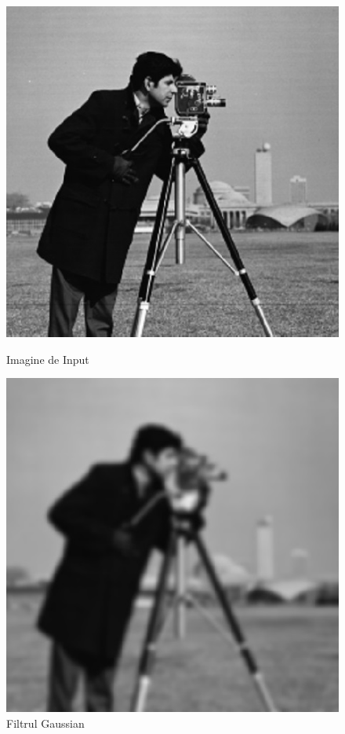 \documentclass[a4paper,12pt]{report}
\begin{document}
\begin{figure}[h!]
    \centering
    \begin{minipage}{0.35\textwidth}
        \centering
        \includegraphics[width=1\textwidth]{images/input_low_pass.jpg}
        \caption{Imagine de Input}
    \end{minipage}
    \hspace{0.01\textwidth}
    \begin{minipage}{0.35\textwidth}
        \centering
        \includegraphics[width=1\textwidth]{images/output_low_pass.jpg}
        \caption{Filtrul Gaussian}
    \end{minipage}
\end{figure}
\FloatBarrier
\end{document}
